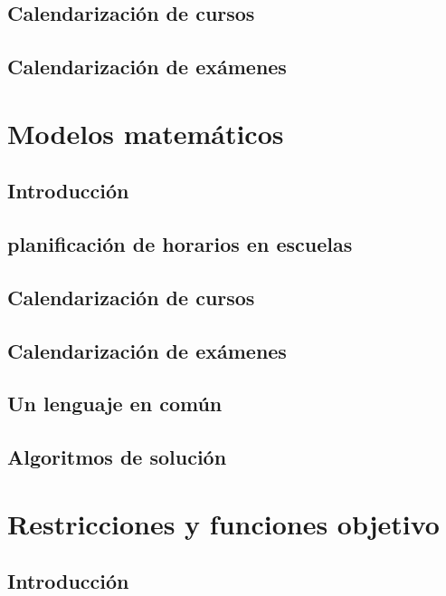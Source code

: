 \documentclass[draft,12pt,headsepline,footsepline,paper=letter]{scrreprt}
\begin{document}
\section{Calendarización de cursos}
\label{calendarizacion_cursos}

\section{Calendarización de exámenes}
\label{calendarizacion_examenes}

\chapter{Modelos matemáticos}

\section{Introducción}

\section{planificación de horarios en escuelas}

\section{Calendarización de cursos}

\section{Calendarización de exámenes}

\section{Un lenguaje en común}

\section{Algoritmos de solución}

\chapter{Restricciones y funciones objetivo}

\section{Introducción}
\end{document}

